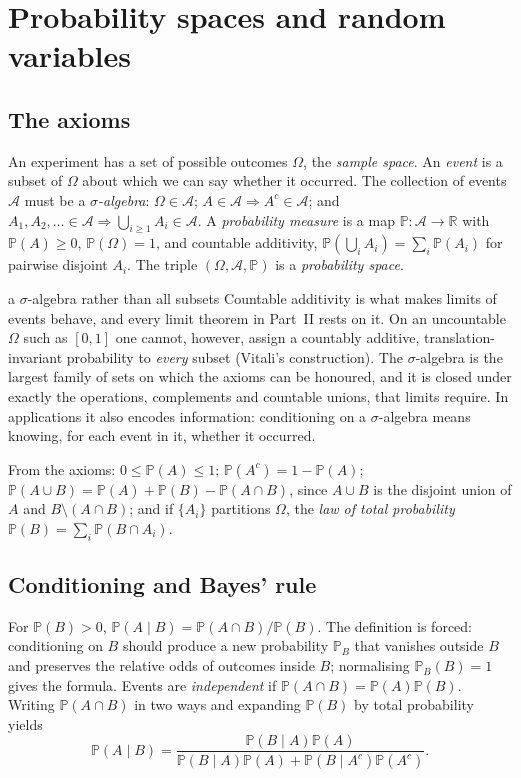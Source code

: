 \documentclass[11pt,a4paper]{article}
\renewcommand{\P}{\mathbb{P}}
\newcommand{\R}{\mathbb{R}}
\newcommand{\A}{\mathcal{A}}
\begin{document}
\section{Probability spaces and random variables}\label{sec:prob}

\subsection{The axioms}

An experiment has a set of possible outcomes $\Omega$, the \emph{sample space}. An \emph{event} is a subset of $\Omega$ about which we can say whether it occurred. The collection of events $\A$ must be a \emph{$\sigma$-algebra}: $\Omega\in\A$; $A\in\A\Rightarrow A^c\in\A$; and $A_1,A_2,\ldots\in\A\Rightarrow\bigcup_{i\ge1}A_i\in\A$. A \emph{probability measure} is a map $\P:\A\to\R$ with $\P(A)\ge0$, $\P(\Omega)=1$, and countable additivity, $\P(\bigcup_iA_i)=\sum_i\P(A_i)$ for pairwise disjoint $A_i$. The triple $(\Omega,\A,\P)$ is a \emph{probability space}.

\begin{whybox}{a $\sigma$-algebra rather than all subsets}
Countable additivity is what makes limits of events behave, and every limit theorem in Part~II rests on it. On an uncountable $\Omega$ such as $[0,1]$ one cannot, however, assign a countably additive, translation-invariant probability to \emph{every} subset (Vitali's construction). The $\sigma$-algebra is the largest family of sets on which the axioms can be honoured, and it is closed under exactly the operations, complements and countable unions, that limits require. In applications it also encodes information: conditioning on a $\sigma$-algebra means knowing, for each event in it, whether it occurred.
\end{whybox}

From the axioms: $0\le\P(A)\le1$; $\P(A^c)=1-\P(A)$; $\P(A\cup B)=\P(A)+\P(B)-\P(A\cap B)$, since $A\cup B$ is the disjoint union of $A$ and $B\setminus(A\cap B)$; and if $\{A_i\}$ partitions $\Omega$, the \emph{law of total probability} $\P(B)=\sum_i\P(B\cap A_i)$.

\subsection{Conditioning and Bayes' rule}

For $\P(B)>0$, $\P(A\mid B)=\P(A\cap B)/\P(B)$. The definition is forced: conditioning on $B$ should produce a new probability $\P_B$ that vanishes outside $B$ and preserves the relative odds of outcomes inside $B$; normalising $\P_B(B)=1$ gives the formula. Events are \emph{independent} if $\P(A\cap B)=\P(A)\P(B)$. Writing $\P(A\cap B)$ in two ways and expanding $\P(B)$ by total probability yields
\begin{equation}\label{eq:bayes}
\P(A\mid B)=\frac{\P(B\mid A)\P(A)}{\P(B\mid A)\P(A)+\P(B\mid A^c)\P(A^c)} .
\end{equation}
\end{document}
